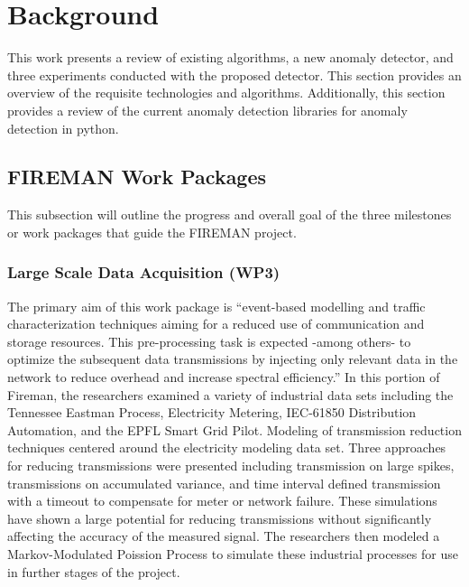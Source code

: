 \section{Background}
This work presents a review of existing algorithms, a new anomaly detector, and three experiments conducted with the proposed detector. This section provides an overview of the requisite technologies and algorithms. Additionally, this section provides a review of the current anomaly detection libraries for anomaly detection in python.

\subsection{FIREMAN Work Packages}

This subsection will outline the progress and overall goal of the three milestones or work packages that guide the FIREMAN project.

\subsubsection{Large Scale Data Acquisition (WP3)}

The primary aim of this work package is \enquote{event-based modelling and traffic characterization techniques aiming for a reduced use of communication and storage resources. This pre-processing task is expected -among others- to optimize the subsequent data transmissions by injecting only relevant data in the network to reduce overhead and increase spectral efficiency.}  In this portion of Fireman, the researchers examined a  variety of industrial data sets including the Tennessee Eastman Process, Electricity Metering, IEC-61850 Distribution Automation, and the EPFL Smart Grid Pilot. Modeling of transmission reduction techniques centered around the electricity modeling data set. Three approaches for reducing transmissions were presented including transmission on large spikes, transmissions on accumulated variance, and time interval defined transmission with a timeout to compensate for meter or network failure. These simulations have shown a large potential for reducing transmissions without significantly affecting the accuracy of the measured signal. The researchers then modeled a Markov-Modulated Poission Process to simulate these industrial processes for use in further stages of the project.


